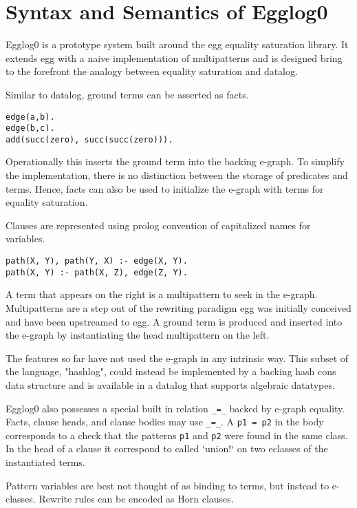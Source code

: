 \documentclass[sigplan,10pt,review,anonymous]{acmart}
\begin{document}
\section{Syntax and Semantics of Egglog0}

Egglog0 is a prototype system built around the egg equality saturation library. It extends egg with a naive implementation of multipatterns and is designed bring to the forefront the analogy between equality saturation and datalog.

Similar to datalog, ground terms can be asserted as facts.

\begin{lstlisting}
edge(a,b).
edge(b,c).
add(succ(zero), succ(succ(zero))).
\end{lstlisting}

Operationally this inserts the ground term into the backing e-graph. To simplify the implementation, there is no distinction between the storage of predicates and terms. Hence, facts can also be used to initialize the e-graph with terms for equality saturation.

Clauses are represented using prolog convention of capitalized names for variables.

\begin{lstlisting}
path(X, Y), path(Y, X) :- edge(X, Y).
path(X, Y) :- path(X, Z), edge(Z, Y).
\end{lstlisting}

A term that appears on the right is a multipattern to seek in the e-graph. Multipatterns are a step out of the rewriting paradigm egg was initially conceived and have been upstreamed to egg. A ground term is produced and inserted into the e-graph by instantiating the head multipattern on the left.

The features so far have not used the e-graph in any intrinsic way. This subset of the language, "hashlog", could instead be implemented by a backing hash cons data structure and is available in a datalog that supports algebraic datatypes.

Egglog0 also possesses a special built in relation \lstinline{_=_} backed by e-graph equality. Facts, clause heads, and clause bodies may use \lstinline{_=_}. A \lstinline{p1 = p2} in the body corresponds to a check that the patterns \lstinline{p1} and \lstinline{p2} were found in the same class.
In the head of a clause it correspond to called `union!` on two eclasses of the instantiated terms.

Pattern variables are best not thought of as binding to terms, but instead to e-classes. Rewrite rules can be encoded as Horn clauses.
\end{document}
